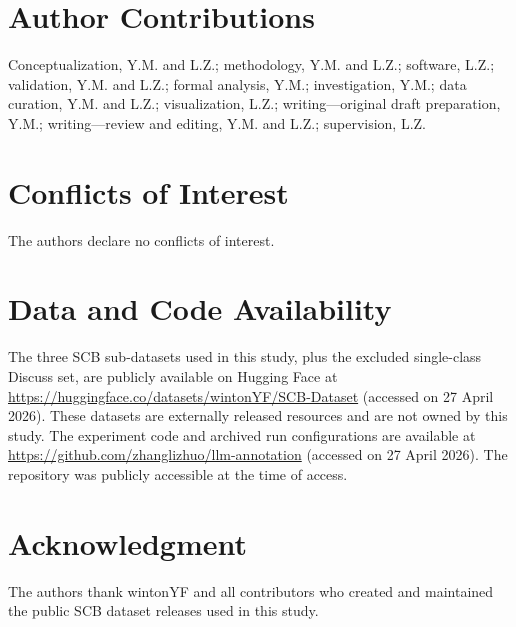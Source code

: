 \documentclass{ieeeaccess}
\begin{document}
\section*{Author Contributions}
Conceptualization, Y.M. and L.Z.; methodology, Y.M. and L.Z.; software,
L.Z.; validation, Y.M. and L.Z.; formal analysis, Y.M.; investigation,
Y.M.; data curation, Y.M. and L.Z.; visualization, L.Z.; writing---original
draft preparation, Y.M.; writing---review and editing, Y.M. and L.Z.;
supervision, L.Z.

\section*{Conflicts of Interest}
The authors declare no conflicts of interest.

\section*{Data and Code Availability}
The three SCB sub-datasets used in this study, plus the excluded
single-class Discuss set, are publicly available on Hugging Face at
\url{https://huggingface.co/datasets/wintonYF/SCB-Dataset} (accessed on
27 April 2026). These datasets are externally released resources and are
not owned by this study. The experiment code and archived run
configurations are available at
\url{https://github.com/zhanglizhuo/llm-annotation} (accessed on 27 April 2026).
The repository was publicly accessible at the time of access.

\section*{Acknowledgment}
The authors thank wintonYF and all contributors who created and maintained
the public SCB dataset releases used in this study.
\end{document}

